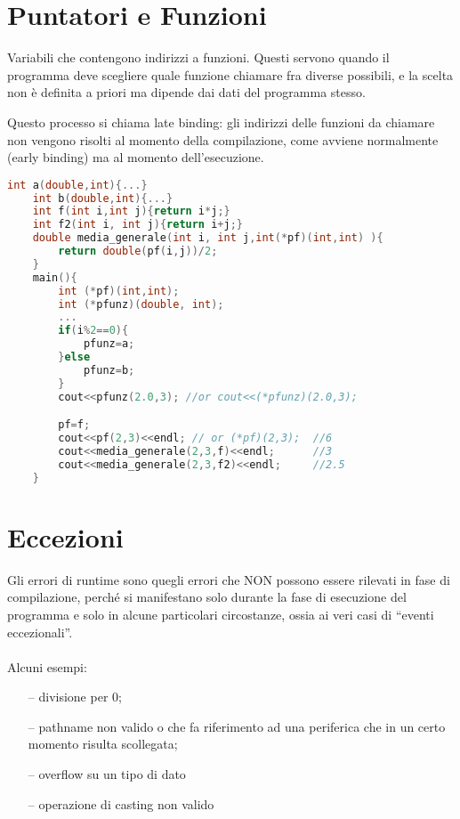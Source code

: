 \section{Puntatori e Funzioni}
Variabili che contengono indirizzi a funzioni. Questi servono quando il programma deve scegliere quale funzione chiamare fra diverse possibili, e la scelta non è definita a priori ma dipende dai dati del programma stesso.

Questo processo si chiama late binding: gli indirizzi delle funzioni da chiamare non vengono risolti al momento della compilazione, come avviene normalmente (early binding) ma al momento dell'esecuzione.

\begin{lstlisting}[language=c++]
    int a(double,int){...}
    int b(double,int){...}
    int f(int i,int j){return i*j;}
    int f2(int i, int j){return i+j;}
    double media_generale(int i, int j,int(*pf)(int,int) ){ 
        return double(pf(i,j))/2; 
    }
    main(){
        int (*pf)(int,int);
        int (*pfunz)(double, int);        
        ...
        if(i%2==0){
            pfunz=a;
        }else
            pfunz=b; 
        }   
        cout<<pfunz(2.0,3); //or cout<<(*pfunz)(2.0,3);

        pf=f;
        cout<<pf(2,3)<<endl; // or (*pf)(2,3);  //6
        cout<<media_generale(2,3,f)<<endl;      //3
        cout<<media_generale(2,3,f2)<<endl;     //2.5
    }
\end{lstlisting}

\section{Eccezioni}
Gli errori di runtime sono quegli errori che NON possono essere
rilevati in fase di compilazione, perché si manifestano solo durante
la fase di esecuzione del programma e solo in alcune particolari
circostanze, ossia ai veri casi di “eventi eccezionali”.
\paragraph{}
Alcuni esempi:

\begin{itemize}
    \item[--] divisione per 0;
    \item[--] pathname non valido o che fa riferimento ad una periferica che in un certo momento risulta scollegata;
    \item[--] overflow su un tipo di dato
    \item[--] operazione di casting non valido
\end{itemize}

